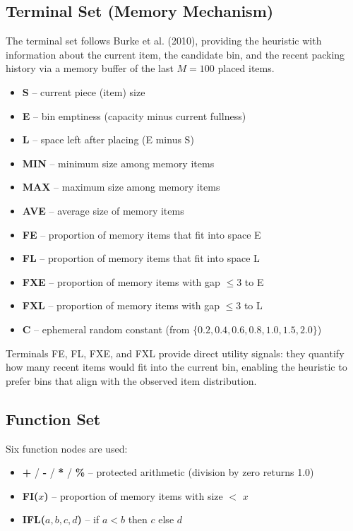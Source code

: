 \documentclass[conference]{IEEEtran}
\begin{document}
\subsection{Terminal Set (Memory Mechanism)}

The terminal set follows Burke et al. (2010), providing the heuristic with information about the current item, the candidate bin, and the recent packing history via a memory buffer of the last $M=100$ placed items.

\begin{itemize}
\item \textbf{S} -- current piece (item) size
\item \textbf{E} -- bin emptiness (capacity minus current fullness)
\item \textbf{L} -- space left after placing (E minus S)
\item \textbf{MIN} -- minimum size among memory items
\item \textbf{MAX} -- maximum size among memory items
\item \textbf{AVE} -- average size of memory items
\item \textbf{FE} -- proportion of memory items that fit into space E
\item \textbf{FL} -- proportion of memory items that fit into space L
\item \textbf{FXE} -- proportion of memory items with gap $\leq 3$ to E
\item \textbf{FXL} -- proportion of memory items with gap $\leq 3$ to L
\item \textbf{C} -- ephemeral random constant (from $\{0.2, 0.4, 0.6, 0.8, 1.0, 1.5, 2.0\}$)
\end{itemize}

Terminals FE, FL, FXE, and FXL provide direct utility signals: they quantify how many recent items would fit into the current bin, enabling the heuristic to prefer bins that align with the observed item distribution.

\subsection{Function Set}

Six function nodes are used:
\begin{itemize}
\item \textbf{+} / \textbf{-} / \textbf{*} / \textbf{\%} -- protected arithmetic (division by zero returns 1.0)
\item \textbf{FI($x$)} -- proportion of memory items with size $<$ $x$
\item \textbf{IFL($a, b, c, d$)} -- if $a < b$ then $c$ else $d$
\end{itemize}
\end{document}
